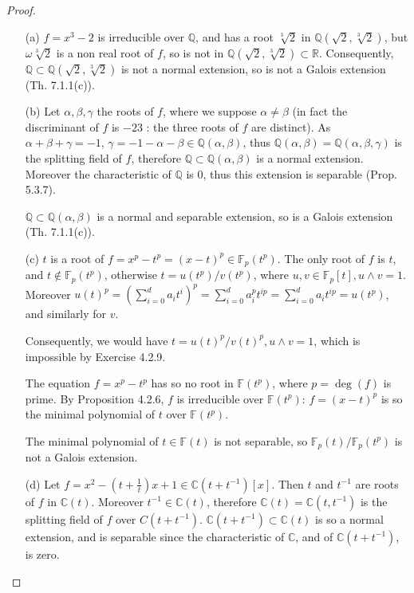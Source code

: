 \documentclass[11pt,a4paper]{article}
\newcommand{\Q}{\mathbb{Q}}
\newcommand{\R}{\mathbb{R}}
\newcommand{\C}{\mathbb{C}}
\newcommand{\F}{\mathbb{F}}
\begin{document}
\begin{proof}
\begin{enumerate}
\item[(a)]
$f = x^3-2$ is  irreducible over $\Q$, and has a root $\sqrt[3]{2}$ in $\Q(\sqrt{2},\sqrt[3]{2})$, but $\omega \sqrt[3]{2}$ is a non real root of $f$, so is not in $\Q(\sqrt{2},\sqrt[3]{2}) \subset \R$. Consequently, $\Q \subset \Q(\sqrt{2},\sqrt[3]{2})$ is not a normal extension, so is not a Galois extension (Th. 7.1.1(c)).

\item[(b)]
Let  $\alpha,\beta,\gamma$ the roots of $f$, where we suppose $\alpha \neq \beta $ (in fact the discriminant of $f$ is $-23$ : the three roots of $f$ are distinct). As $\alpha+\beta+\gamma = -1$, $\gamma = -1 - \alpha - \beta \in \Q(\alpha,\beta)$, thus $\Q(\alpha,\beta) = \Q(\alpha,\beta,\gamma)$ is the splitting field of $f$, therefore  $\Q \subset \Q(\alpha,\beta)$ is a normal extension. Moreover the characteristic of $\Q$ is 0, thus this extension is separable (Prop. 5.3.7).

$\Q \subset \Q(\alpha,\beta)$ is a normal and separable extension, so is a Galois extension (Th. 7.1.1(c)).

\item[(c)]$t$ is a root of $f = x^p-t^p = (x-t)^p\in \F_p(t^p)$.
The only root of $f$ is $t$, and $t \not \in \F_p(t^p)$, otherwise $t = u(t^p)/v(t^p)$, where $u,v \in \F_p[t], u \wedge v= 1$. Moreover $u(t)^p = (\sum_{i=0}^d a_i t^i)^p = \sum_{i=0}^d a_i^p t^{ip} = \sum_{i=0}^da_i t^{ip} = u(t^p)$, and similarly for $v$.

Consequently, we would have $t= u(t)^p/v(t)^p,u\wedge v = 1$, which is impossible by Exercise 4.2.9.

The equation $f = x^p - t^p$ has so no root in $\F(t^p)$, where $p =\deg(f)$ is prime. By Proposition 4.2.6, $f$ is irreducible over $\F(t^p)$: $f = (x-t)^p$ is so the minimal polynomial of $t$ over $\F(t^p)$.

The minimal polynomial of $t \in \F(t)$ is not separable, so $\F_p(t)/\F_p(t^p)$ is not a Galois extension.

\item[(d)]
Let $f = x^2-\left(t+\frac{1}{t}\right)x + 1 \in \C(t+t^{-1})[x]$. Then  $t$ and $t^{-1}$ are roots of $f$ in  $\C(t)$. Moreover $t^{-1} \in \C(t)$, therefore $\C(t) = \C(t,t^{-1})$ is the splitting field of $f$ over $C(t+t^{-1})$. $ \C(t+t^{-1}) \subset \C(t)$ is so a normal extension, and is separable since the characteristic of $\C$, and of $\C(t+t^{-1})$, is zero. 


\end{enumerate}
\end{proof}
\end{document}
